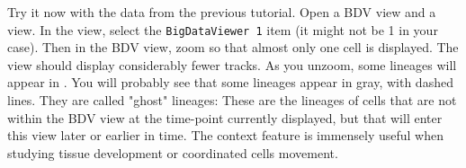 Try it now with the data from the previous tutorial.
Open a BDV view and a \TrackScheme view.
In the \TrackScheme view, select the \texttt{BigDataViewer 1} item (it might not be 1 in your case).
Then in the BDV view, zoom so that almost only one cell is displayed. 
The \TrackScheme view should display considerably fewer tracks. 
As you unzoom, some lineages will appear in \TrackScheme.
You will probably see that some lineages appear in gray, with dashed lines.
They are called "ghost" lineages: 
These are the lineages of cells that are not within the BDV view at the time-point currently displayed, but that will enter this view later or earlier in time. 
The context feature is immensely useful when studying tissue development or coordinated cells movement. 
